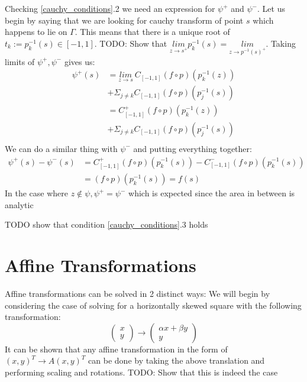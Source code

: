 \documentclass{article}
\begin{document}
Checking \eqref{cauchy_conditions}.2 we need an expression for $\psi^+$ and $\psi^-$.
Let us begin by saying that we are looking for cauchy transform of point $s$ which happens to lie on $\Gamma$.
This means that there is a unique root of $t_k := p_k^{-1}(s) \in [-1,1]$.
TODO: Show that $\underset{z\to s^+}{lim} p_k^{-1}(s) =\underset{z\to p^{-1}(s)^+}{lim}$.
Taking limits of $\psi^+, \psi^-$ gives us:
\begin{equation}\begin{split}
\psi^+(s)&=\underset{z\to s}{lim}\:C_{[-1,1]}(f\circ p)(p_k^{-1}(z)) \\
&+\Sigma_{j\neq k}C_{[-1,1]}(f\circ p)(p_j^{-1}(s)) \\
&=C^+_{[-1,1]}(f\circ p)(p_k^{-1}(z)) \\
&+\Sigma_{j\neq k}C_{[-1,1]}(f\circ p)(p_j^{-1}(s)) \\
\end{split}\end{equation}
We can do a similar thing with $\psi^-$ and putting everything together:
\begin{equation}\begin{split}
\psi^+(s)-\psi^-(s)&=C_{[-1,1]}^+(f\circ p)(p_k^{-1}(s))-C_{[-1,1]}^-(f\circ p)(p_k^{-1}(s)) \\
&= (f\circ p)(p_k^{-1}(s)) = f(s)
\end{split}\end{equation}
In the case where $z \notin \psi, \psi^+=\psi^-$ which is expected since the area in between is analytic

TODO show that condition \eqref{cauchy_conditions}.3 holds
\section{Affine Transformations}
Affine transformations can be solved in 2 distinct ways:
We will begin by considering the case of solving for a horizontally skewed square with the following transformation:
$$\begin{pmatrix}x\\y\end{pmatrix}\rightarrow
\begin{pmatrix}\alpha x+\beta y\\y\end{pmatrix}$$
It can be shown that any affine transformation in the form of $(x, y)^T \rightarrow A(x,y)^T$ can be done by taking the above translation and performing scaling and rotations.
TODO: Show that this is indeed the case
\end{document}
